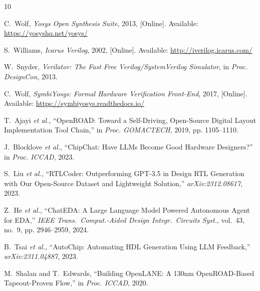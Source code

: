 \begin{thebibliography}{10}

C.~Wolf, \emph{Yosys Open Synthesis Suite}, 2013, [Online].
Available: \url{https://yosyshq.net/yosys/}

S.~Williams, \emph{Icarus Verilog}, 2002, [Online].
Available: \url{http://iverilog.icarus.com/}

W.~Snyder, \emph{Verilator: The Fast Free Verilog/SystemVerilog Simulator},
in \emph{Proc. DesignCon}, 2013.

C.~Wolf, \emph{SymbiYosys: Formal Hardware Verification Front-End},
2017, [Online].
Available: \url{https://symbiyosys.readthedocs.io/}

T.~Ajayi \emph{et al.}, ``OpenROAD: Toward a Self-Driving,
Open-Source Digital Layout Implementation Tool Chain,''
in \emph{Proc. GOMACTECH}, 2019, pp. 1105--1110.

J.~Blocklove \emph{et al.}, ``ChipChat: Have LLMs Become Good Hardware
Designers?'' in \emph{Proc. ICCAD}, 2023.

S.~Liu \emph{et al.}, ``RTLCoder: Outperforming GPT-3.5 in Design RTL
Generation with Our Open-Source Dataset and Lightweight Solution,''
\emph{arXiv:2312.08617}, 2023.

Z.~He \emph{et al.}, ``ChatEDA: A Large Language Model Powered Autonomous
Agent for EDA,'' \emph{IEEE Trans.\ Comput.-Aided Design Integr.\ Circuits
Syst.}, vol.~43, no.~9, pp. 2946--2959, 2024.

B.~Tsai \emph{et al.}, ``AutoChip: Automating HDL Generation Using
LLM Feedback,'' \emph{arXiv:2311.04887}, 2023.

M.~Shalan and T.~Edwards, ``Building OpenLANE: A 130nm OpenROAD-Based
Tapeout-Proven Flow,'' in \emph{Proc. ICCAD}, 2020.

\end{thebibliography}
